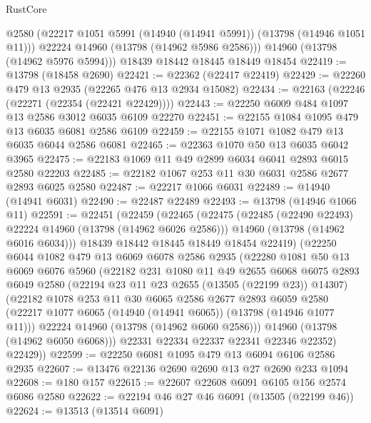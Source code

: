 \begin{lexlean}{RustCore}
\begin{coremodule}
        @2580
        (@22217 @1051 @5991 (@14940 (@14941 @5991)) (@13798 (@14946 @1051 @11)))
        @22224
        @14960
        (@13798 (@14962 @5986 @2586)))
      @14960
      (@13798 (@14962 @5976 @5994)))
    @18439
    @18442
    @18445
    @18449
    @18454
@22419 := @13798 (@18458 @2690)
@22421 := @22362 (@22417 @22419)
@22429 := @22260 @479 @13 @2935 (@22265 @476 @13 @2934 @15082)
@22434 := @22163 (@22246 (@22271 (@22354 (@22421 @22429))))
@22443 := @22250 @6009 @484 @1097 @13 @2586 @3012 @6035 @6109 @22270
@22451 := @22155 @1084 @1095 @479 @13 @6035 @6081 @2586 @6109
@22459 := @22155 @1071 @1082 @479 @13 @6035 @6044 @2586 @6081
@22465 := @22363 @1070 @50 @13 @6035 @6042 @3965
@22475 := @22183 @1069 @11 @49 @2899 @6034 @6041 @2893 @6015 @2580 @22203
@22485 := @22182 @1067 @253 @11 @30 @6031 @2586 @2677 @2893 @6025 @2580
@22487 := @22217 @1066 @6031
@22489 := @14940 (@14941 @6031)
@22490 := @22487 @22489
@22493 := @13798 (@14946 @1066 @11)
@22591 := @22451
    (@22459
      (@22465
        (@22475
          (@22485 (@22490 @22493) @22224 @14960 (@13798 (@14962 @6026 @2586)))
          @14960
          (@13798 (@14962 @6016 @6034)))
        @18439
        @18442
        @18445
        @18449
        @18454
        @22419)
      (@22250
        @6044
        @1082
        @479
        @13
        @6069
        @6078
        @2586
        @2935
        (@22280
          @1081
          @50
          @13
          @6069
          @6076
          @5960
          (@22182
            @231
            @1080
            @11
            @49
            @2655
            @6068
            @6075
            @2893
            @6049
            @2580
            (@22194 @23 @11 @23 @2655 (@13505 (@22199 @23)) @14307)
            (@22182
              @1078
              @253
              @11
              @30
              @6065
              @2586
              @2677
              @2893
              @6059
              @2580
              (@22217 @1077 @6065 (@14940 (@14941 @6065)) (@13798 (@14946 @1077 @11)))
              @22224
              @14960
              (@13798 (@14962 @6060 @2586)))
            @14960
            (@13798 (@14962 @6050 @6068)))
          @22331
          @22334
          @22337
          @22341
          @22346
          @22352)
        @22429))
@22599 := @22250 @6081 @1095 @479 @13 @6094 @6106 @2586 @2935
@22607 := @13476 @22136 @2690 @2690 @13 @27 @2690 @233 @1094
@22608 := @180 @157
@22615 := @22607 @22608 @6091 @6105 @156 @2574 @6086 @2580
@22622 := @22194 @46 @27 @46 @6091 (@13505 (@22199 @46))
@22624 := @13513 (@13514 @6091)

\end{coremodule}
\end{lexlean}
